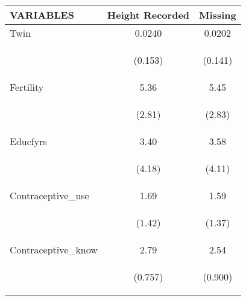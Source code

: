 \documentclass{article}[11pt,subeqn]
\begin{document}
\begin{spacing}{1.25}
\begin{table}[ht]
\begin{center}
\begin{tabular}{lcc} \toprule
 VARIABLES & Height Recorded & Missing \\ \midrule
Twin & 0.0240 & 0.0202 \\
\begin{footnotesize}\end{footnotesize} & \begin{footnotesize}(0.153)\end{footnotesize} & \begin{footnotesize}(0.141)\end{footnotesize} \\
Fertility &  5.36 & 5.45\\
\begin{footnotesize}\end{footnotesize} & \begin{footnotesize}(2.81)\end{footnotesize} & \begin{footnotesize}(2.83)\end{footnotesize} \\
Educfyrs & 3.40 & 3.58\\
\begin{footnotesize}\end{footnotesize} & \begin{footnotesize}(4.18)\end{footnotesize} & \begin{footnotesize}(4.11)\end{footnotesize} \\
Contraceptive\_use &  1.69 &  1.59 \\
\begin{footnotesize}\end{footnotesize} & \begin{footnotesize}(1.42)\end{footnotesize} & \begin{footnotesize}(1.37)\end{footnotesize} \\
Contraceptive\_know &  2.79 & 2.54 \\
\begin{footnotesize}\end{footnotesize} & \begin{footnotesize}(0.757)\end{footnotesize} & \begin{footnotesize}(0.900)\end{footnotesize} \\

\end{tabular}
\end{center}
\end{table}
\end{spacing}
\end{document}
